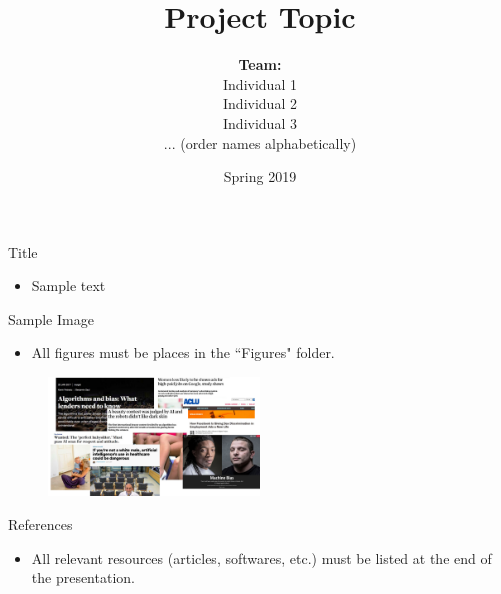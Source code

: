 \documentclass[11pt]{beamer}
\begin{document}
\author[]{\begin{tabular}{c} 
\\ \textbf{Team:} \\
{\small Individual 1}\\
{\small Individual 2}\\
{\small Individual 3}\\
{\small ... (order names alphabetically)}
\end{tabular}}

\date{Spring 2019}

\title{Project Topic}



\begin{frame}{Title}
\begin{itemize}
\item Sample text
\end{itemize}
\end{frame}

\begin{frame}{Sample Image}
\begin{itemize}
\item All figures must be places in the ``Figures" folder.
\end{itemize}
\begin{figure}[t!]
    \centering
        \includegraphics[width=0.5\textwidth]{Figures/media_negative.pdf}
\end{figure}
\end{frame}


\begin{frame}{References}
\begin{itemize}
\item All relevant resources (articles, softwares, etc.) must be listed at the end of the presentation.
\end{itemize}
\end{frame}
\end{document}
